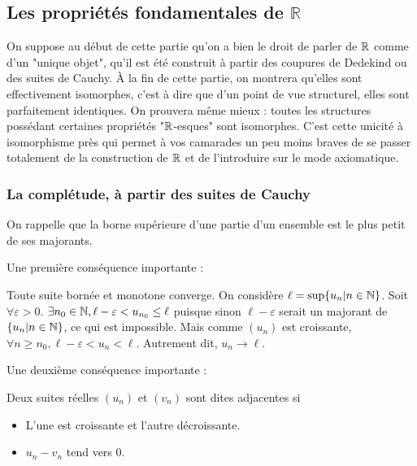 \begin{defini}[Multiplication]
    
\end{defini}

\subsection{Les propriétés fondamentales de \texorpdfstring{$\mathbb{R}$}{R}}
On suppose au début de cette partie qu'on a bien le droit de parler de $\mathbb{R}$ comme d'un "unique objet", qu'il est été construit à partir des coupures de Dedekind ou des suites de Cauchy. À la fin de cette partie, on montrera qu'elles sont effectivement isomorphes, c'est à dire que d'un point de vue structurel, elles sont parfaitement identiques. On prouvera même mieux : toutes les structures possédant certaines propriétés "$\mathbb{R}$-esques" sont isomorphes. C'est cette unicité à isomorphisme près qui permet à vos camarades un peu moins braves de se passer totalement de la construction de $\mathbb{R}$ et de l'introduire sur le mode axiomatique.

\subsubsection{La complétude, à partir des suites de Cauchy}

On rappelle que la borne supérieure d'une partie d'un ensemble est le plus petit de ses majorants.

\begin{prop}
    
\end{prop}

Une première conséquence importante :

\begin{theoreme} \label{limmono}
    Toute suite bornée et monotone converge.
    \tcblower
    On considère $\ell=\sup\{u_n|n\in \mathbb{N}\}$. Soit $\forall\varepsilon > 0$. $\exists n_0 \in \mathbb{N}, \ell-\varepsilon<u_{n_0}\leq \ell$ puisque sinon $\ell-\varepsilon$ serait un majorant de $\{u_n|n\in \mathbb{N}\}$, ce qui est impossible. Mais comme $(u_n)$ est croissante, $\forall n \geq n_0, \ell-\varepsilon < u_n < \ell$. Autrement dit, $u_n \to \ell$.
\end{theoreme}

Une deuxième conséquence importante :

\begin{defini}
    Deux suites réelles $(u_n)$ et $(v_n)$ sont dites adjacentes si
    \begin{itemize}
        \item L'une est croissante et l'autre décroissante.
        \item $u_n-v_n$ tend vers 0.
    \end{itemize}
\end{defini}

